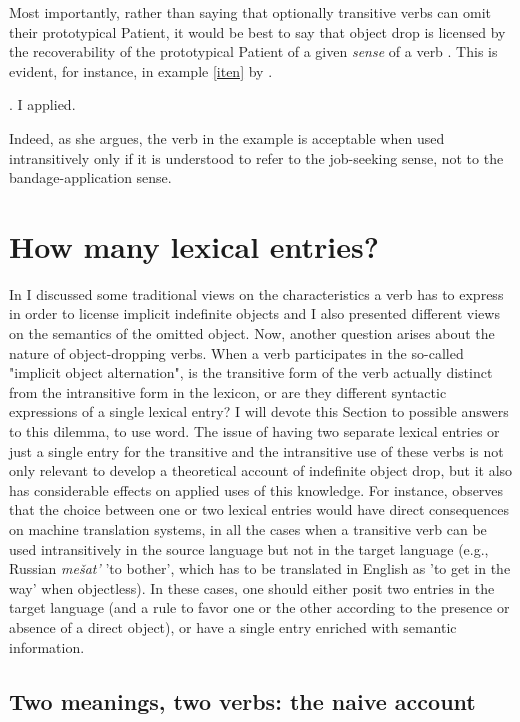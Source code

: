 Most importantly, rather than saying that optionally transitive verbs can omit their prototypical Patient, it would be best to say that object drop is licensed by the recoverability of the prototypical Patient of a given \textit{sense} of a verb \parencite[100]{fillmore1969types}. This is evident, for instance, in example \ref{iten} by \textcite{iten2005null}.

\ex. \label{iten} I applied.

Indeed, as she argues, the verb in the example is acceptable when used intransitively only if it is understood to refer to the job-seeking sense, not to the bandage-application sense.


\section{How many lexical entries?} 

In  I discussed some traditional views on the characteristics a verb has to express in order to license implicit indefinite objects and I also presented different views on the semantics of the omitted object. Now, another question arises about the nature of object-dropping verbs. When a verb participates in the so-called "implicit object alternation", is the transitive form of the verb actually distinct from the intransitive form in the lexicon, or are they different syntactic expressions of a single lexical entry? I will devote this Section to possible answers to this dilemma, to use  word. The issue of having two separate lexical entries or just a single entry for the transitive and the intransitive use of these verbs is not only relevant to develop a theoretical account of indefinite object drop, but it also has considerable effects on applied uses of this knowledge. For instance, \textcite[118]{McShane2005} observes that the choice between one or two lexical entries would have direct consequences on machine translation systems, in all the cases when a transitive verb can be used intransitively in the source language but not in the target language (e.g., Russian \textit{me\v{s}at'} 'to bother', which has to be translated in English as 'to get in the way' when objectless). In these cases, one should either posit two entries in the target language (and a rule to favor one or the other according to the presence or absence of a direct object), or have a single entry enriched with semantic information.


\subsection{Two meanings, two verbs: the naive account} 

